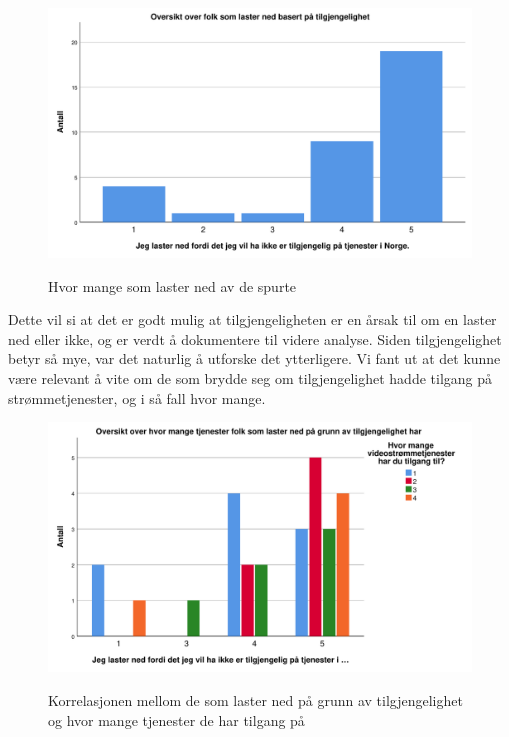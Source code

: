 \begin{figure}[H]
    \centering
    \includegraphics[scale=0.45]{case_1/bilder/tilgjengelighet.pdf}
    \label{fig:tilgjengelighet}
    \caption[Tilgjengelighet]{Hvor mange som laster ned av de spurte}
\end{figure}

Dette vil si at det er godt mulig at tilgjengeligheten er en årsak til om en laster ned eller ikke, og er verdt å dokumentere til videre analyse. Siden tilgjengelighet betyr så mye, var det naturlig å utforske det ytterligere. Vi fant ut at det kunne være relevant å vite om de som brydde seg om tilgjengelighet hadde tilgang på strømmetjenester, og i så fall hvor mange.

\begin{figure}[H]
    \centering
    \includegraphics[scale=0.45]{case_1/bilder/tilgjengelighet_antallstromming.pdf}
    \label{fig:tilgjengelighet_antallstromming}
    \caption[Tilgjengelighet vs antall strømmetjenester]{Korrelasjonen mellom de som laster ned på grunn av tilgjengelighet og hvor mange tjenester de har tilgang på}
\end{figure}

